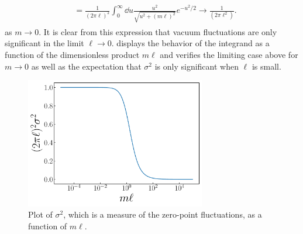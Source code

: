 {\begin{align}
{\begin{aligned}
             &= \frac{1}{(2 \pi \ell)^2} \int_{0}^{\infty} \dd{u} \frac{u^2}{\sqrt{u^2 + (m \ell)^2}} e^{-u^2 / 2} \rightarrow \frac{1}{(2 \pi \ell^2)}
.\end{aligned}
}
\end{align}
as $m \rightarrow 0$.
It is clear from this expression that vacuum fluctuations are only significant in the limit $\ell \rightarrow 0$.
 displays the behavior of the integrand as a function of the dimensionless product $m \ell$ and verifies the limiting case above for $m \rightarrow 0$ as well as the expectation that $\sigma^2$ is only significant when $\ell$ is small.

\begin{figure}
    \centering
    \includegraphics[width=0.7\textwidth]{prob4.pdf}
    \caption{Plot of $\sigma^2$, which is a measure of the zero-point fluctuations, as a function of $m \ell$.}
    \label{fig:prob4}
\end{figure}

}
    

